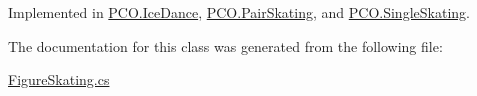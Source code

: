 Implemented in \hyperlink{classPCO_1_1IceDance_a277430a17d25085022ea3567a133fa81}{P\+C\+O.\+Ice\+Dance}, \hyperlink{classPCO_1_1PairSkating_aaab23d1dec6f01ef77ec808be48d6b75}{P\+C\+O.\+Pair\+Skating}, and \hyperlink{classPCO_1_1SingleSkating_a36f8a341cc9e3259d898eb4ff15a98ec}{P\+C\+O.\+Single\+Skating}.



The documentation for this class was generated from the following file\+:\begin{DoxyCompactItemize}
\item 
\hyperlink{FigureSkating_8cs}{Figure\+Skating.\+cs}\end{DoxyCompactItemize}
